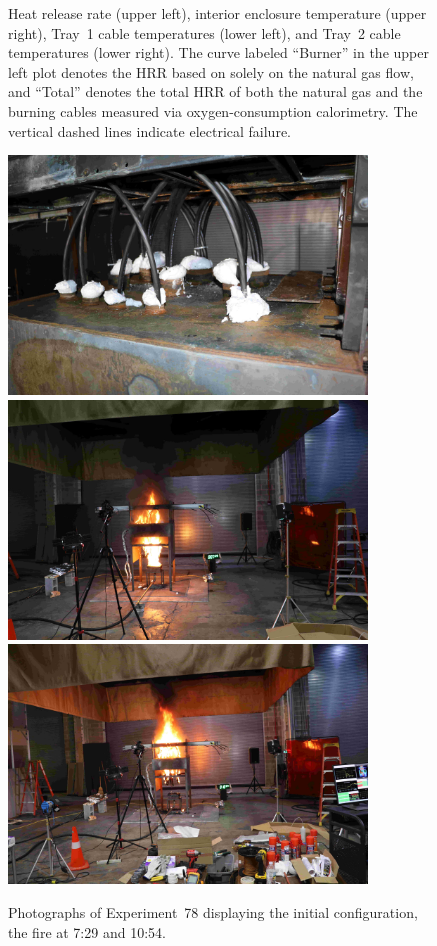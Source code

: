 \begin{figure}[H]
\caption[HRR and temperatures of Experiment 78]{Heat release rate (upper left), interior enclosure temperature (upper right), Tray~1 cable temperatures (lower left), and Tray~2 cable temperatures (lower right). The curve labeled ``Burner'' in the upper left plot denotes the HRR based on solely on the natural gas flow, and ``Total'' denotes the total HRR of both the natural gas and the burning cables measured via oxygen-consumption calorimetry. The vertical dashed lines indicate electrical failure.}
\label{fig:Test_78}
\end{figure}

\begin{figure}[p]
\centering
\includegraphics[height=2.50in]{../FIGURES/Test_78_Photo_1} \\ \vspace{0.1in}
\includegraphics[height=2.50in]{../FIGURES/Test_78_Photo_2} \\ \vspace{0.1in}
\includegraphics[height=2.50in]{../FIGURES/Test_78_Photo_3}
\caption[Photographs of Experiment~78]{Photographs of Experiment~78 displaying the initial configuration, the fire at 7:29 and 10:54.}
\label{fig:Test_78_photos}
\end{figure}


